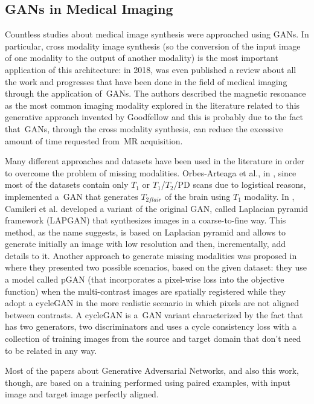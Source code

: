 \subsection{GANs in Medical Imaging}
\label{subsec:gans_medical_imaging}
Countless studies about medical image synthesis were approached using \ac{GAN}s. In particular, cross modality image synthesis (so the conversion of the input image of one modality to the output of another modality) is the most important application of this architecture: in 2018, was even published a review\cite{Yi_2019} about all the work and progresses that have been done in the field of medical imaging through the application of~\ac{GAN}s. The authors described the magnetic resonance as the most common imaging modality explored in the literature related to this generative approach invented by Goodfellow and this is probably due to the fact that~\ac{GAN}s, through the cross modality synthesis, can reduce the excessive amount of time requested from~\ac{MR} acquisition.

\vspace{5mm} %
Many different approaches and datasets have been used in the literature in order to overcome the problem of missing modalities. Orbes-Arteaga et al., in \cite{flair&t1}, since most of the datasets contain only $T_1$ or $T_1$/$T_2$/PD scans due to logistical reasons, implemented a~\ac{GAN} that generates $T_{2flair}$ of the brain using $T_1$ modality. 
In \cite{lapgan}, Camileri et al. developed a variant of the original GAN, called Laplacian pyramid framework (LAPGAN) that synthesizes images in a coarse-to-fine way. This method, as the name suggests, is based on Laplacian pyramid and allows to generate initially an image with low resolution and then, incrementally, add details to it. Another approach to generate missing modalities was proposed in \cite{double_scenario} where they presented two possible scenarios, based on the given dataset: they use a model called pGAN (that incorporates a pixel-wise loss into the objective function) when the multi-contrast images are spatially registered while they adopt a cycleGAN\cite{cycle_gan}  in the more realistic scenario in which pixels are not aligned between contrasts. A cycleGAN is a~\ac{GAN} variant characterized by the fact that has two generators, two discriminators and uses a cycle consistency loss with a collection of training images from the source and target domain that don't need to be related in any way.

Most of the papers about Generative Adversarial Networks, and also this work, though, are based on a training performed using paired examples, with input image and target image perfectly aligned. 

